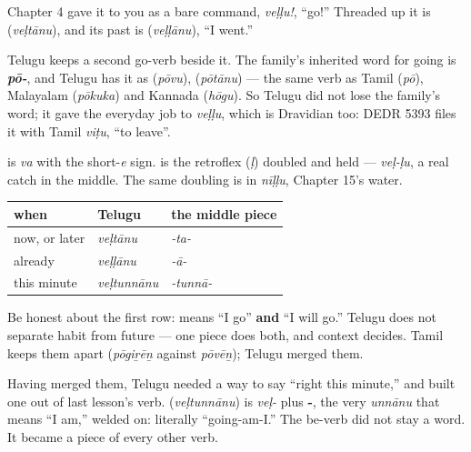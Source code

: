 Chapter 4 gave it to you as a bare command, \emph{veḷḷu!}, \textquotedblleft{}go!\textquotedblright{} Threaded up it is \textbf{} (\emph{veḷtānu}), and its past is \textbf{} (\emph{veḷḷānu}), \textquotedblleft{}I went.\textquotedblright{}

Telugu keeps a second go-verb beside it. The family's inherited word for going is \emph{\textbf{pō-}}, and Telugu has it as \textbf{} (\emph{pōvu}), \textbf{} (\emph{pōtānu}) — the same verb as Tamil \textbf{} (\emph{pō}), Malayalam \textbf{} (\emph{pōkuka}) and Kannada \textbf{} (\emph{hōgu}). So Telugu did not lose the family's word; it gave the everyday job to \emph{veḷḷu}, which is Dravidian too: DEDR 5393 files it with Tamil \emph{viṭu}, \textquotedblleft{}to leave\textquotedblright{}.

\begin{sounds}
\textbf{} is \emph{va} with the short-\emph{e} sign. \textbf{} is the retroflex \textbf{} (\emph{ḷ}) doubled and held — \emph{veḷ-ḷu}, a real catch in the middle. The same doubling is in \emph{nīḷḷu}, Chapter 15's water.
\end{sounds}

\begin{grammarlens}[title={Grammar Lens: one piece for \textquotedblleft{}I go\textquotedblright{} and \textquotedblleft{}I will go\textquotedblright{}}]
\noindent
\begin{tabularx}{\linewidth}{@{}>{\raggedright\arraybackslash}X>{\raggedright\arraybackslash}X>{\raggedright\arraybackslash}X@{}}
\toprule
\textbf{when} & \textbf{Telugu} & \textbf{the middle piece} \\
\midrule
now, or later & \emph{veḷtānu} & \emph{-ta-} \\
already & \emph{veḷḷānu} & \emph{-ā-} \\
this minute & \emph{veḷtunnānu} & \emph{-tunnā-} \\
\bottomrule
\end{tabularx}

Be honest about the first row: \textbf{} means \textquotedblleft{}I go\textquotedblright{} \textbf{and} \textquotedblleft{}I will go.\textquotedblright{} Telugu does not separate habit from future — one piece does both, and context decides. Tamil keeps them apart (\emph{pōgiṟēṉ} against \emph{pōvēṉ}); Telugu merged them.

Having merged them, Telugu needed a way to say \textquotedblleft{}right this minute,\textquotedblright{} and built one out of last lesson's verb. \textbf{} (\emph{veḷtunnānu}) is \emph{veḷ-} plus \textbf{-}, the very \emph{unnānu} that means \textquotedblleft{}I am,\textquotedblright{} welded on: literally \textquotedblleft{}going-am-I.\textquotedblright{} The be-verb did not stay a word. It became a piece of every other verb.
\end{grammarlens}


